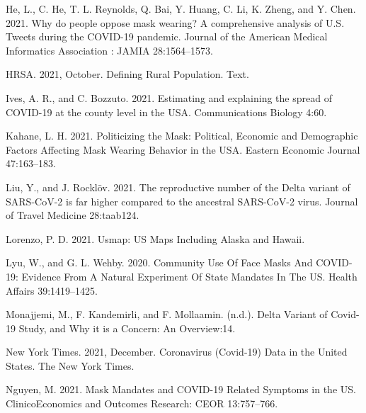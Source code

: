 \documentclass[
  12pt,
]{article}
\newlength{\cslhangindent}
\newlength{\cslentryspacingunit} %
\newenvironment{CSLReferences}[2] %
 {%
  \setlength{\parindent}{0pt}
  \ifodd #1
  \let\oldpar\par
  \def\par{\hangindent=\cslhangindent\oldpar}
  \fi
  \setlength{\parskip}{#2\cslentryspacingunit}
 }%
 {}
\begin{document}
\begin{CSLReferences}{1}{0}
\leavevmode{}%
He, L., C. He, T. L. Reynolds, Q. Bai, Y. Huang, C. Li, K. Zheng, and Y. Chen. 2021. Why do people oppose mask wearing? {A} comprehensive analysis of {U}.{S}. Tweets during the {COVID}-19 pandemic. Journal of the American Medical Informatics Association : JAMIA 28:1564--1573.

\leavevmode{}%
HRSA. 2021, October. Defining {Rural} {Population}. Text.

\leavevmode{}%
Ives, A. R., and C. Bozzuto. 2021. Estimating and explaining the spread of {COVID}-19 at the county level in the {USA}. Communications Biology 4:60.

\leavevmode{}%
Kahane, L. H. 2021. Politicizing the {Mask}: {Political}, {Economic} and {Demographic} {Factors} {Affecting} {Mask} {Wearing} {Behavior} in the {USA}. Eastern Economic Journal 47:163--183.

\leavevmode{}%
Liu, Y., and J. Rocklöv. 2021. The reproductive number of the {Delta} variant of {SARS}-{CoV}-2 is far higher compared to the ancestral {SARS}-{CoV}-2 virus. Journal of Travel Medicine 28:taab124.

\leavevmode{}%
Lorenzo, P. D. 2021. Usmap: {US} {Maps} {Including} {Alaska} and {Hawaii}.

\leavevmode{}%
Lyu, W., and G. L. Wehby. 2020. Community {Use} {Of} {Face} {Masks} {And} {COVID}-19: {Evidence} {From} {A} {Natural} {Experiment} {Of} {State} {Mandates} {In} {The} {US}. Health Affairs 39:1419--1425.

\leavevmode{}%
Monajjemi, M., F. Kandemirli, and F. Mollaamin. (n.d.). Delta {Variant} of {Covid}-19 {Study}, and {Why} it is a {Concern}: {An} {Overview}:14.

\leavevmode{}%
New York Times. 2021, December. Coronavirus ({Covid}-19) {Data} in the {United} {States}. The New York Times.

\leavevmode{}%
Nguyen, M. 2021. Mask {Mandates} and {COVID}-19 {Related} {Symptoms} in the {US}. ClinicoEconomics and Outcomes Research: CEOR 13:757--766.


\end{CSLReferences}
\end{document}
